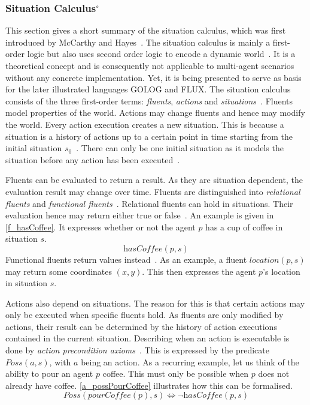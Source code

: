 \subsubsection[Situation Calculus]{Situation Calculus$^\circ$}\label{fun:apl_sitCalc}
This section gives a short summary of the situation calculus, which was first introduced by McCarthy and Hayes~\cite{mccarthy_philosophical_1969}.
The situation calculus is mainly a first-order logic but also uses second order logic to encode a dynamic world~\cite{levesque_golog:_1997}. %
It is a theoretical concept and is consequently not applicable to multi-agent scenarios without any concrete implementation.
Yet, it is being presented to serve as basis for the later illustrated languages GOLOG and FLUX.
The situation calculus consists of the three first-order terms: \emph{fluents}, \emph{actions} and \emph{situations}~\cite{mccarthy_philosophical_1969,boutilier_decision_2000}. %
Fluents model properties of the world.
Actions may change fluents and hence may modify the world.
Every action execution creates a new situation.
This is because a situation is a history of actions up to a certain point in time starting from the initial situation $s_0$~\cite{schiffel_reconciling_2006,levesque_golog:_1997}. %
There can only be one initial situation as it models the situation before any action has been executed~\cite{pirri_contributions_1999}. %

Fluents can be evaluated to return a result.
As they are situation dependent, the evaluation result may change over time.
Fluents are distinguished into \emph{relational fluents} and \emph{functional fluents}~\cite{levesque_golog:_1997}. %
Relational fluents can hold in situations.
Their evaluation hence may return either true or false~\cite{boutilier_decision_2000}. %
An example is given in \autoref{f_hasCoffee}.
It expresses whether or not the agent $p$ has a cup of coffee in situation $s$.
\begin{equation}\label{f_hasCoffee}
  \textit{hasCoffee}(p,s)
\end{equation}
Functional fluents return values instead~\cite{levesque_golog:_1997}. %
As an example, a fluent $\textit{location}(p,s)$ may return some coordinates $(x,y)$.
This then expresses the agent $p$'s location in situation $s$.

Actions also depend on situations.
The reason for this is that certain actions may only be executed when specific fluents hold.
As fluents are only modified by actions, their result can be determined by the history of action executions contained in the current situation.
Describing when an action is executable is done by \emph{action precondition axioms}~\cite{lin_state_1994}. %
This is expressed by the predicate $\textit{Poss}(a,s)$, with $a$ being an action.
As a recurring example, let us think of the ability to pour an agent $p$ coffee.
This must only be possible when $p$ does not already have coffee.
\autoref{a_possPourCoffee} illustrates how this can be formalised.
\begin{equation}\label{a_possPourCoffee}
  \textit{Poss}(\textit{pourCoffee}(p),s) \Leftrightarrow \neg \textit{hasCoffee}(p,s)
\end{equation}

